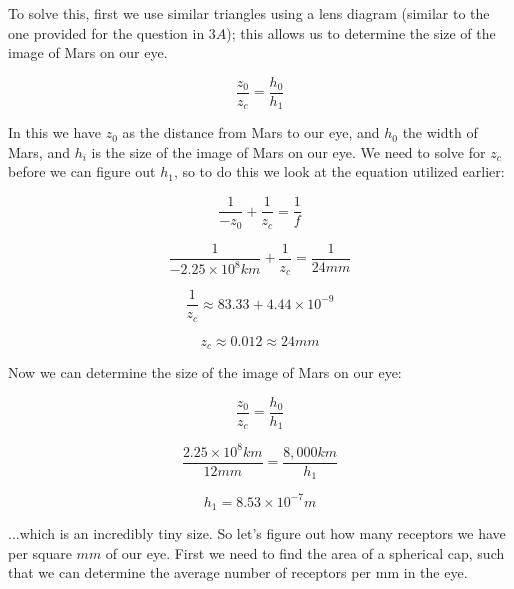 \documentclass{article}
\begin{document}
To solve this, first we use similar triangles using a lens diagram (similar to the one provided for the question in $3A$); this allows us to determine the size of the image of Mars on our eye.

\begin{equation}
    \frac{z_0}{z_c} = \frac{h_0}{h_1}
\end{equation}

\noindent In this we have $z_0$ as the distance from Mars to our eye, and $h_0$ the width of Mars, and $h_i$ is the size of the image of Mars on our eye. We need to solve for $z_c$ before we can figure out $h_1$, so to do this we look at the equation utilized earlier:

\begin{equation}
    \frac{1}{-z_0}+\frac{1}{z_c}=\frac{1}{f}
\end{equation}

\begin{equation}
    \frac{1}{-2.25\times10^8km}+\frac{1}{z_c}=\frac{1}{24mm}
\end{equation}

\begin{equation}
    \frac{1}{z_c} \approx 83.33 + 4.44\times10^{-9}
\end{equation}

\begin{equation}
    z_c \approx 0.012 \approx 24 mm
\end{equation}

Now we can determine the size of the image of Mars on our eye:

\begin{equation}
    \frac{z_0}{z_c} = \frac{h_0}{h_1}
\end{equation}

\begin{equation}
    \frac{2.25\times10^8km}{12mm} = \frac{8,000km}{h_1}
\end{equation}

\begin{equation}
    h_1 = 8.53\times10^{-7} m
\end{equation}

\noindent ...which is an incredibly tiny size. So let's figure out how many receptors we have per square $mm$ of our eye. First we need to find the area of a spherical cap, such that we can determine the average number of receptors per mm in the eye.
\end{document}
